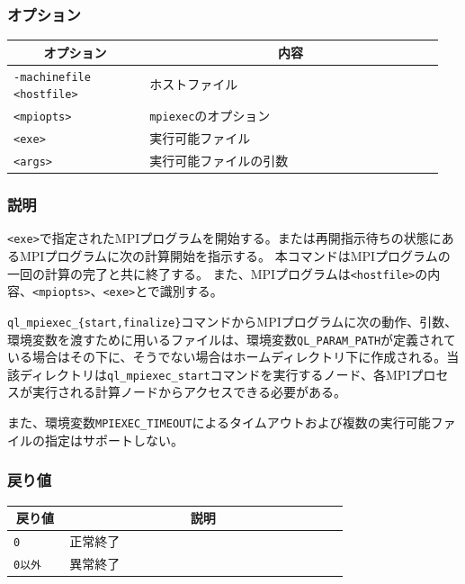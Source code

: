 \documentclass[twoside,11pt,fleqn]{book}
\begin{document}
\subsubsection*{オプション}{\quad}
\begin{table}[!ht]
\footnotesize
\begin{tabular}{|p{0.30\linewidth}|p{0.65\linewidth}|} \hline
\multicolumn{1}{|c}{\textbf{オプション}}&\multicolumn{1}{|c|}{\textbf{内容}}\\ \hline \hline
\texttt{-machinefile <hostfile>}&ホストファイル\\ \hline
\texttt{<mpiopts>}&\texttt{mpiexec}のオプション\\ \hline
\texttt{<exe>}&実行可能ファイル\\ \hline
\texttt{<args>}&実行可能ファイルの引数\\ \hline
\end{tabular}
\vspace{-0em}
\end{table}
\FloatBarrier

\subsubsection*{説明}{\quad}
\texttt{<exe>}で指定されたMPIプログラムを開始する。または再開指示待ちの状態にあるMPIプログラムに次の計算開始を指示する。
本コマンドはMPIプログラムの一回の計算の完了と共に終了する。
また、MPIプログラムは\texttt{<hostfile>}の内容、\texttt{<mpiopts>}、\texttt{<exe>}とで識別する。

\texttt{ql\_mpiexec\_\{start,finalize\}}コマンドからMPIプログラムに次の動作、引数、環境変数を渡すために用いるファイルは、環境変数\texttt{QL\_PARAM\_PATH}が定義されている場合はその下に、そうでない場合はホームディレクトリ下に作成される。当該ディレクトリは\texttt{ql\_mpiexec\_start}コマンドを実行するノード、各MPIプロセスが実行される計算ノードからアクセスできる必要がある。

また、環境変数\texttt{MPIEXEC\_TIMEOUT}によるタイムアウトおよび複数の実行可能ファイルの指定はサポートしない。

\subsubsection*{戻り値}{\quad}
\begin{table}[!h]
\footnotesize
\begin{tabular}{|p{0.15\linewidth}|p{0.75\linewidth}|} \hline
\multicolumn{1}{|c}{\textbf{戻り値}}&\multicolumn{1}{|c|}{\textbf{説明}}\\ \hline \hline
\texttt{0}&正常終了\\ \hline
\texttt{0以外}&異常終了\\ \hline
\end{tabular}
\end{table}
\FloatBarrier
\end{document}
